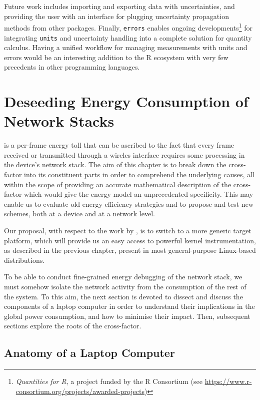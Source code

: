 \documentclass[twoside,nohyper]{tufte-book}
\theoremstyle{definition}
\theoremstyle{definition}
\theoremstyle{definition}
\theoremstyle{remark}
\begin{document}
Future work includes importing and exporting data with uncertainties,
and providing the user with an interface for plugging uncertainty
propagation methods from other packages. Finally, \texttt{errors}
enables ongoing developments\footnote{\emph{Quantities for R}, a project
  funded by the R Consortium (see
  \url{https://www.r-consortium.org/projects/awarded-projects})} for
integrating \texttt{units} and uncertainty handling into a complete
solution for quantity calculus. Having a unified workflow for managing
measurements with units and errors would be an interesting addition to
the R ecosystem with very few precedents in other programming languages.

\hypertarget{ch:04}{%
\chapter{Deseeding Energy Consumption of Network Stacks}\label{ch:04}}

 is a per-frame energy toll that can be
ascribed to the fact that every frame received or transmitted through a
wireles interface requires some processing in the device's network
stack. The aim of this chapter is to break down the cross-factor into
its constituent parts in order to comprehend the underlying causes, all
within the scope of providing an accurate mathematical description of
the cross-factor which would give the energy model an unprecedented
specificity. This may enable us to evaluate old energy efficiency
strategies and to propose and test new schemes, both at a device and at
a network level.

Our proposal, with respect to the work by \citet{Serrano2014}, is to
switch to a more generic target platform, which will provide us an easy
access to powerful kernel instrumentation, as described in the previous
chapter, present in most general-purpose Linux-based distributions.

To be able to conduct fine-grained energy debugging of the network
stack, we must somehow isolate the network activity from the consumption
of the rest of the system. To this aim, the next section is devoted to
dissect and discuss the components of a laptop computer in order to
understand their implications in the global power consumption, and how
to minimise their impact. Then, subsequent sections explore the roots of
the cross-factor.

\hypertarget{anatomy-of-a-laptop-computer}{%
\section{Anatomy of a Laptop
Computer}\label{anatomy-of-a-laptop-computer}}
\end{document}
